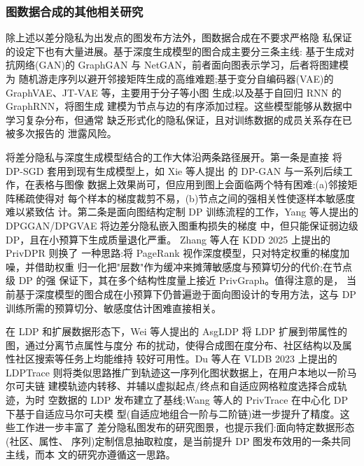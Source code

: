 \subsubsection{图数据合成的其他相关研究}

\par 除上述以差分隐私为出发点的图发布方法外，图数据合成在不要求严格隐
私保证的设定下也有大量进展。基于深度生成模型的图合成主要分三条主线:
基于生成对抗网络(GAN)的 GraphGAN\cite{wang_graphgan_2018} 与
NetGAN\cite{bojchevski_netgan_2018}，前者面向图表示学习，后者将图建模为
随机游走序列以避开邻接矩阵生成的高维难题;基于变分自编码器(VAE)的
GraphVAE\cite{kurkova_graphvae_2018}、JT-VAE 等，主要用于分子等小图
生成;以及基于自回归 RNN 的 GraphRNN\cite{you_graphrnn_2018}，将图生成
建模为节点与边的有序添加过程。这些模型能够从数据中学习复杂分布，但通常
缺乏形式化的隐私保证，且对训练数据的成员关系存在已被多次报告的
泄露风险。

\par 将差分隐私与深度生成模型结合的工作大体沿两条路径展开。第一条是直接
将 DP-SGD\cite{abadi_deep_2016} 套用到现有生成模型上，如 Xie 等人提出
的 DP-GAN\cite{xie_differentially_2018} 与一系列后续工作，在表格与图像
数据上效果尚可，但应用到图上会面临两个特有困难:(a)邻接矩阵稀疏使得对
每个样本的梯度裁剪不易，(b)节点之间的强相关性使逐样本敏感度难以紧致估
计。第二条是面向图结构定制 DP 训练流程的工作，Yang 等人提出的
DPGGAN/DPGVAE\cite{yang_secure_2021} 将边差分隐私嵌入图重构损失的梯度
中，但只能保证弱边级 DP，且在小预算下生成质量退化严重。
Zhang 等人在 KDD 2025 上提出的 PrivDPR\cite{zhang_privdpr_2025} 则换了
一种思路:将 PageRank 视作深度模型，只对特定权重的梯度加噪，并借助权重
归一化把"层数"作为缓冲来摊薄敏感度与预算切分的代价;在节点级 DP 的强
保证下，其在多个结构性度量上接近 PrivGraph。值得注意的是，
当前基于深度模型的图合成在小预算下仍普遍逊于面向图设计的专用方法，这与
DP 训练所需的预算切分、敏感度估计困难直接相关。

\par 在 LDP 和扩展数据形态下，Wei 等人提出的 AsgLDP
\cite{wei_asgldp_2020} 将 LDP 扩展到带属性的图，通过分离节点属性与度分
布的扰动，使得合成图在度分布、社区结构以及属性社区搜索等任务上均能维持
较好可用性。Du 等人在 VLDB 2023 上提出的 LDPTrace\cite{du_ldptrace_2023}
则将类似思路推广到轨迹这一序列化图状数据上，在用户本地以一阶马尔可夫链
建模轨迹内转移、并辅以虚拟起点/终点和自适应网格粒度选择合成轨迹，为时
空数据的 LDP 发布建立了基线;Wang 等人的
PrivTrace\cite{wang_privtrace_2023} 在中心化 DP 下基于自适应马尔可夫模
型(自适应地组合一阶与二阶链)进一步提升了精度。这些工作进一步丰富了
差分隐私图发布的研究图景，也提示我们:面向特定数据形态(社区、属性、
序列)定制信息抽取粒度，是当前提升 DP 图发布效用的一条共同主线，而本
文的研究亦遵循这一思路。


